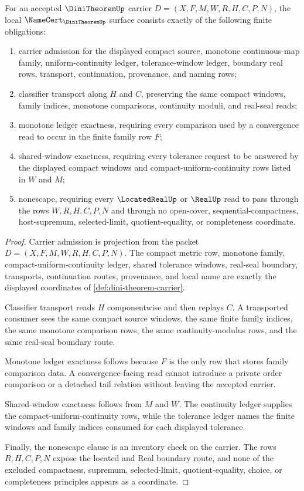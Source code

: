 \begin{theorem}\label{thm:dini-theorem-namecert-obligations}
For an accepted $\DiniTheoremUp$ carrier $D=(X,F,M,W,R,H,C,P,N)$, the local $\NameCert_{\DiniTheoremUp}$ surface consists exactly of the following finite obligations:
\begin{enumerate}
\item carrier admission for the displayed compact source, monotone continuous-map family, uniform-continuity ledger, tolerance-window ledger, boundary real rows, transport, continuation, provenance, and naming rows;
\item classifier transport along $H$ and $C$, preserving the same compact windows, family indices, monotone comparisons, continuity moduli, and real-seal reads;
\item monotone ledger exactness, requiring every comparison used by a convergence read to occur in the finite family row $F$;
\item shared-window exactness, requiring every tolerance request to be answered by the displayed compact windows and compact-uniform-continuity rows listed in $W$ and $M$;
\item nonescape, requiring every $\LocatedRealUp$ or $\RealUp$ read to pass through the rows $W,R,H,C,P,N$ and through no open-cover, sequential-compactness, host-supremum, selected-limit, quotient-equality, or completeness coordinate.
\end{enumerate}
\end{theorem}
\begin{proof}
Carrier admission is projection from the packet $D=(X,F,M,W,R,H,C,P,N)$. The compact metric row, monotone family, compact-uniform-continuity ledger, shared tolerance windows, real-seal boundary, transports, continuation routes, provenance, and local name are exactly the displayed coordinates of \autoref{def:dini-theorem-carrier}.

Classifier transport reads $H$ componentwise and then replays $C$. A transported consumer sees the same compact source windows, the same finite family indices, the same monotone comparison rows, the same continuity-modulus rows, and the same real-seal boundary route.

Monotone ledger exactness follows because $F$ is the only row that stores family comparison data. A convergence-facing read cannot introduce a private order comparison or a detached tail relation without leaving the accepted carrier.

Shared-window exactness follows from $M$ and $W$. The continuity ledger supplies the compact-uniform-continuity rows, while the tolerance ledger names the finite windows and family indices consumed for each displayed tolerance.

Finally, the nonescape clause is an inventory check on the carrier. The rows $R,H,C,P,N$ expose the located and Real boundary route, and none of the excluded compactness, supremum, selected-limit, quotient-equality, choice, or completeness principles appears as a coordinate.
\end{proof}

